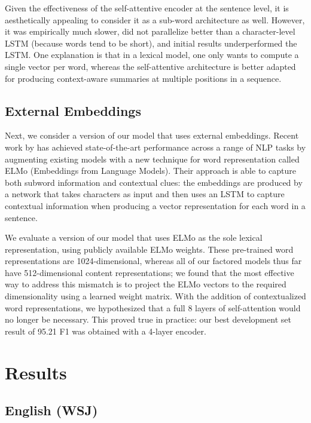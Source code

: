 \documentclass[11pt,a4paper]{article}
\begin{document}
Given the effectiveness of the self-attentive encoder at the sentence level, it is aesthetically appealing to consider it as a sub-word architecture as well.  However, it was empirically much slower, did not parallelize better than a character-level LSTM (because words tend to be short), and initial results underperformed the LSTM. One explanation is that in a lexical model, one only wants to compute a single vector per word, whereas the self-attentive architecture is better adapted for producing context-aware summaries at multiple positions in a sequence.

\subsection{External Embeddings}
\label{subsec:elmo}

Next, we consider a version of our model that uses external embeddings. Recent work by \citet{peters_deep_2018} has achieved state-of-the-art performance across a range of NLP tasks by augmenting existing models with a new technique for word representation called ELMo (Embeddings from Language Models). Their approach is able to capture both subword information and contextual clues: the embeddings are produced by a network that takes characters as input and then uses an LSTM to capture contextual information when producing a vector representation for each word in a sentence.

We evaluate a version of our model that uses ELMo as the sole lexical representation, using publicly available ELMo weights. These pre-trained word representations are 1024-dimensional, whereas all of our factored models thus far have 512-dimensional content representations; we found that the most effective way to address this mismatch is to project the ELMo vectors to the required dimensionality using a learned weight matrix. With the addition of contextualized word representations, we hypothesized that a full 8 layers of self-attention would no longer be necessary. This proved true in practice: our best development set result of 95.21 F1 was obtained with a 4-layer encoder.

\section{Results}
\label{sec:results}

\subsection{English (WSJ)}
\end{document}

